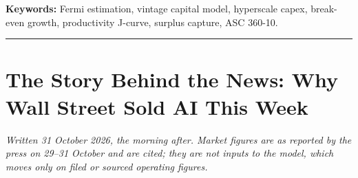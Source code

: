 \documentclass[11pt,letterpaper]{article}
\begin{document}
\vspace{0.5em}
\noindent\textbf{Keywords:} Fermi estimation, vintage capital model, hyperscale capex, break-even growth, productivity J-curve, surplus capture, ASC 360-10.
\vspace{0.5em}
\hrule
\vspace{1em}

\section*{The Story Behind the News: Why Wall Street Sold AI This Week}\label{sec:news}
\noindent\textit{Written 31 October 2026, the morning after. Market figures are as reported by the press on 29--31 October and are cited; they are not inputs to the model, which moves only on filed or sourced operating figures.}
\end{document}
